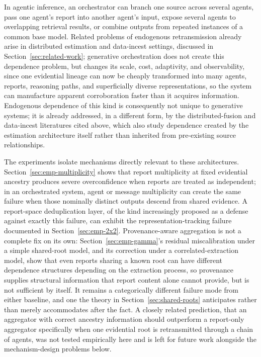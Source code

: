 \documentclass[11pt]{article}
\theoremstyle{definition}
\begin{document}
In agentic inference, an orchestrator can branch one source across several agents, pass one agent's report into another agent's input, expose several agents to overlapping retrieval results, or combine outputs from repeated instances of a common base model. Related problems of endogenous retransmission already arise in distributed estimation and data-incest settings, discussed in Section~\ref{sec:related-work}; generative orchestration does not create this dependence problem, but changes its scale, cost, adaptivity, and observability, since one evidential lineage can now be cheaply transformed into many agents, reports, reasoning paths, and superficially diverse representations, so the system can manufacture apparent corroboration faster than it acquires information. Endogenous dependence of this kind is consequently not unique to generative systems; it is already addressed, in a different form, by the distributed-fusion and data-incest literatures cited above, which also study dependence created by the estimation architecture itself rather than inherited from pre-existing source relationships.

The experiments isolate mechanisms directly relevant to these architectures. Section~\ref{sec:emp-multiplicity} shows that report multiplicity at fixed evidential ancestry produces severe overconfidence when reports are treated as independent; in an orchestrated system, agent or message multiplicity can create the same failure when those nominally distinct outputs descend from shared evidence. A report-space deduplication layer, of the kind increasingly proposed as a defense against exactly this failure, can exhibit the representation-tracking failure documented in Section~\ref{sec:emp-2x2}. Provenance-aware aggregation is not a complete fix on its own: Section~\ref{sec:emp-gamma}'s residual miscalibration under a simple shared-root model, and its correction under a correlated-extraction model, show that even reports sharing a known root can have different dependence structures depending on the extraction process, so provenance supplies structural information that report content alone cannot provide, but is not sufficient by itself. It remains a categorically different failure mode from either baseline, and one the theory in Section~\ref{sec:shared-roots} anticipates rather than merely accommodates after the fact. A closely related prediction, that an aggregator with correct ancestry information should outperform a report-only aggregator specifically when one evidential root is retransmitted through a chain of agents, was not tested empirically here and is left for future work alongside the mechanism-design problems below.
\end{document}
